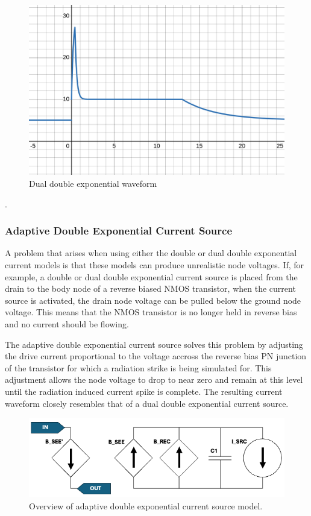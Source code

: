 \documentclass[conference]{IEEEtran}
\begin{document}
\begin{figure}[H]
\centering
\includegraphics[width=0.9\linewidth]{dual_double_exponential.png}
\caption{Dual double exponential waveform}
\label{fig:dual_double_exp}
\end{figure}

\cite{Pepper1990}.

\subsubsection{Adaptive Double Exponential Current Source}
A problem that arises when using either the double or dual double exponential current models is that these models can produce unrealistic node voltages. If, for example, a double or dual double exponential current source is placed from the drain to the body node of a reverse biased NMOS transistor, when the current source is activated, the drain node voltage can be pulled below the ground node voltage. This means that the NMOS transistor is no longer held in reverse bias and no current should be flowing.

The adaptive double exponential current source solves this problem by adjusting the drive current proportional to the voltage accross the reverse bias PN junction of the transistor for which a radiation strike is being simulated for. This adjustment allows the node voltage to drop to near zero and remain at this level until the radiation induced current spike is complete. The resulting current waveform closely resembles that of a dual double exponential current source.

\begin{figure}[htbp]
\centering
\includegraphics[width=1\linewidth]{Adaptive_Model_Cropped.png}
\caption{Overview of adaptive double exponential current source model.}
\label{fig:adaptive_model_overview}
\end{figure}
\end{document}
